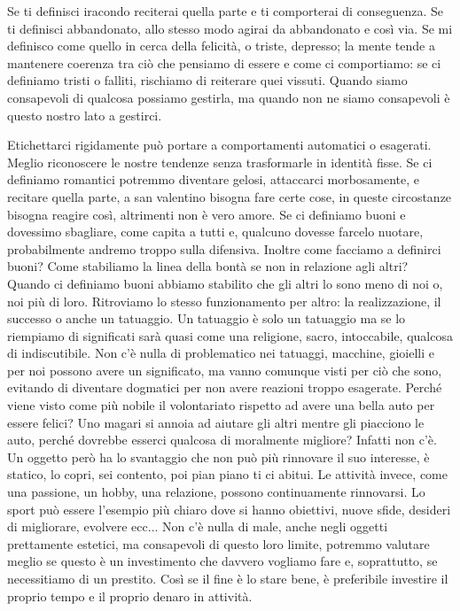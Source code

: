 \documentclass[12pt]{book} %
\begin{document}
Se ti definisci iracondo reciterai quella parte e ti
comporterai di conseguenza. Se ti definisci abbandonato, allo stesso modo agirai da abbandonato e così via. 
Se mi definisco come quello in cerca della felicità, o triste, depresso; la mente tende a mantenere coerenza tra ciò che pensiamo di essere e come ci comportiamo: se ci definiamo tristi o falliti, rischiamo di reiterare quei vissuti.
Quando siamo consapevoli di qualcosa possiamo gestirla, ma quando non ne siamo consapevoli è questo nostro lato a gestirci.

Etichettarci rigidamente può portare a comportamenti automatici o esagerati. Meglio riconoscere le nostre tendenze senza trasformarle in identità fisse.
Se ci definiamo romantici potremmo diventare gelosi, attaccarci morbosamente, e recitare quella parte, a san valentino bisogna fare certe cose, in queste circostanze bisogna reagire così, altrimenti non è vero amore. Se ci definiamo buoni e dovessimo sbagliare, come capita a tutti e, qualcuno dovesse farcelo nuotare, probabilmente andremo troppo sulla difensiva. 
Inoltre come facciamo a definirci buoni? Come stabiliamo la linea della bontà se non in relazione agli altri? Quando ci definiamo buoni abbiamo stabilito che gli altri lo sono meno di noi o, noi più di loro. Ritroviamo lo stesso funzionamento per altro: la realizzazione, il successo o anche un tatuaggio. Un tatuaggio è solo un tatuaggio ma se lo riempiamo di significati sarà quasi come una religione, sacro, intoccabile, qualcosa di indiscutibile. Non c'è nulla di problematico nei tatuaggi, macchine, gioielli e per noi possono avere un significato, ma vanno comunque visti per ciò che sono, evitando di diventare dogmatici per non avere reazioni troppo esagerate.
Perché viene visto come più nobile il volontariato rispetto ad avere una bella auto per essere felici? Uno magari si annoia ad aiutare gli altri mentre gli piacciono le auto, perché dovrebbe esserci qualcosa di moralmente migliore? Infatti non c'è.
Un oggetto però ha lo svantaggio che non può più rinnovare il suo interesse, è statico, lo copri, sei contento, poi pian piano ti ci abitui. Le attività invece, come una passione, un hobby, una relazione, possono continuamente rinnovarsi. Lo sport può essere l'esempio più chiaro dove si hanno obiettivi, nuove sfide, desideri di migliorare, evolvere ecc... Non c'è nulla di male, anche negli oggetti prettamente estetici, ma consapevoli di questo loro limite, potremmo valutare meglio se questo è un investimento che davvero vogliamo fare e, soprattutto, se necessitiamo di un prestito. Così se il fine è lo stare bene, è preferibile investire il proprio tempo e il proprio denaro in attività.
\end{document}

